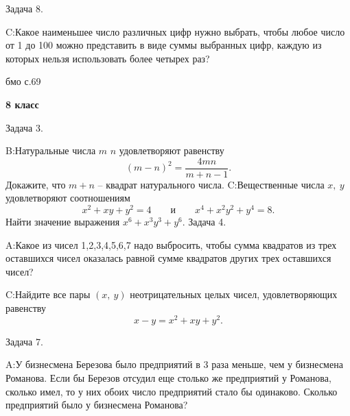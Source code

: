 \documentclass[11pt,a4paper,book]{ncc} \usepackage{modules/nonstahp_book}
\begin{document}
Задача 8.

\medbreak\noindent
C:\qquad Какое наименьшее число различных цифр нужно выбрать,
чтобы любое число от 1 до 100 можно представить в виде суммы выбранных цифр, каждую из которых нельзя использовать более четырех раз?

бмо с.69
\vfill\eject

\medbreak\centerline{\bf 8 класс}\bigbreak\noindent

\bigbreak\noindent

\bigbreak\noindent
Задача 3.\par\noindent

\medbreak\noindent
B:\qquad Натуральные числа $m$  $n$ удовлетворяют равенству
$$
(m-n)^2=\frac{4mn}{m+n-1}.
$$
Докажите, что $m+n$ -- квадрат натурального числа.
\medbreak\noindent
C:\qquad Вещественные числа $x,\  y$ удовлетворяют соотношениям
$$
x^2+xy+y^2=4\qquad\text{и}\qquad x^4+x^2y^2+y^4=8.
$$
Найти значение выражения $x^6+x^3y^3+y^6.$
\bigbreak\noindent
Задача 4. \par\noindent
A:\qquad Какое из чисел 1,2,3,4,5,6,7 надо выбросить, чтобы сумма квадратов из трех оставшихся чисел оказалась равной сумме квадратов других трех оставшихся чисел?
\medbreak\noindent

\medbreak\noindent
C:\qquad Найдите все пары $(x,\  y)$ неотрицательных целых чисел, удовлетворяющих равенству
$$x-y=x^2+xy+y^2.$$
\bigbreak\noindent

Задача 7. \par\noindent
A:\qquad У бизнесмена Березова было предприятий в 3 раза меньше, чем у бизнесмена Романова. Если бы Березов отсудил еще столько же предприятий у Романова, сколько имел, то у них обоих число предприятий стало бы одинаково. Сколько предприятий было у бизнесмена Романова?
\medbreak\noindent
\end{document}
